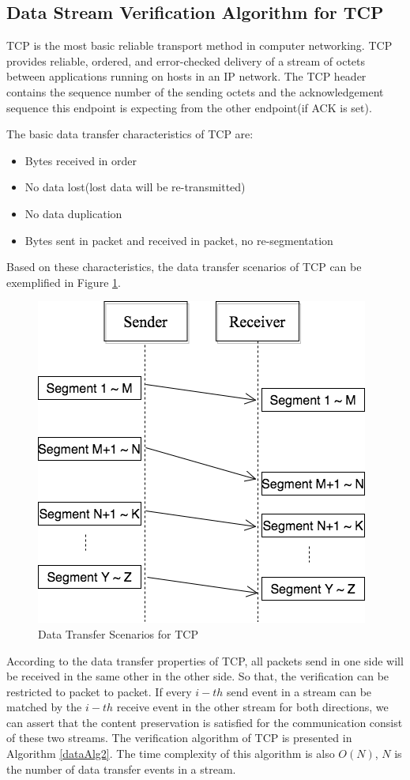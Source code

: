 \subsection{Data Stream Verification Algorithm for TCP}
TCP is the most basic reliable transport method in computer networking. TCP provides reliable, ordered, and error-checked delivery of a stream of octets between applications running on hosts in an IP network. The TCP header contains the sequence number of the sending octets and the acknowledgement sequence this endpoint is expecting from the other endpoint(if ACK is set). 

The basic data transfer characteristics of TCP are:
\begin{itemize}
  \item Bytes received in order
  \item No data lost(lost data will be re-transmitted)
  \item No data duplication
  \item Bytes sent in packet and received in packet, no re-segmentation
\end{itemize}

Based on these characteristics,  the data transfer scenarios of TCP can be exemplified in Figure \ref{tcp}.

\begin{figure}[H]
\centerline{\includegraphics[scale=0.4]{Figures/tcp}}
 \caption{Data Transfer Scenarios for TCP}
\label{tcp}
\end{figure}

According to the data transfer properties of TCP, all packets send in one side will be received in the same other in the other side. So that, the verification can be restricted to packet to packet. If every $i-th$ send event in a stream can be matched by the $i-th$ receive event in the other stream for both directions, we can assert that the content preservation is satisfied for the communication consist of these two streams. The verification algorithm of TCP is presented in Algorithm \ref{dataAlg2}. The time complexity of this algorithm is also $O(N)$, $N$ is the number of data transfer events in a stream.

